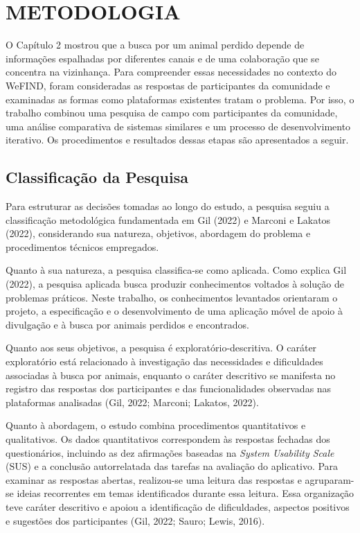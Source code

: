 \section{METODOLOGIA}

O Capítulo 2 mostrou que a busca por um animal perdido depende de informações espalhadas por diferentes canais e de uma colaboração que se concentra na vizinhança. Para compreender essas necessidades no contexto do WeFIND, foram consideradas as respostas de participantes da comunidade e examinadas as formas como plataformas existentes tratam o problema. Por isso, o trabalho combinou uma pesquisa de campo com participantes da comunidade, uma análise comparativa de sistemas similares e um processo de desenvolvimento iterativo. Os procedimentos e resultados dessas etapas são apresentados a seguir.

\subsection{Classificação da Pesquisa}

Para estruturar as decisões tomadas ao longo do estudo, a pesquisa seguiu a classificação metodológica fundamentada em Gil (2022) e Marconi e Lakatos (2022), considerando sua natureza, objetivos, abordagem do problema e procedimentos técnicos empregados.

Quanto à sua natureza, a pesquisa classifica-se como aplicada. Como explica Gil (2022), a pesquisa aplicada busca produzir conhecimentos voltados à solução de problemas práticos. Neste trabalho, os conhecimentos levantados orientaram o projeto, a especificação e o desenvolvimento de uma aplicação móvel de apoio à divulgação e à busca por animais perdidos e encontrados.

Quanto aos seus objetivos, a pesquisa é exploratório-descritiva. O caráter exploratório está relacionado à investigação das necessidades e dificuldades associadas à busca por animais, enquanto o caráter descritivo se manifesta no registro das respostas dos participantes e das funcionalidades observadas nas plataformas analisadas (Gil, 2022; Marconi; Lakatos, 2022).

Quanto à abordagem, o estudo combina procedimentos quantitativos e qualitativos. Os dados quantitativos correspondem às respostas fechadas dos questionários, incluindo as dez afirmações baseadas na \textit{System Usability Scale} (SUS) e a conclusão autorrelatada das tarefas na avaliação do aplicativo. Para examinar as respostas abertas, realizou-se uma leitura das respostas e agruparam-se ideias recorrentes em temas identificados durante essa leitura. Essa organização teve caráter descritivo e apoiou a identificação de dificuldades, aspectos positivos e sugestões dos participantes (Gil, 2022; Sauro; Lewis, 2016).

